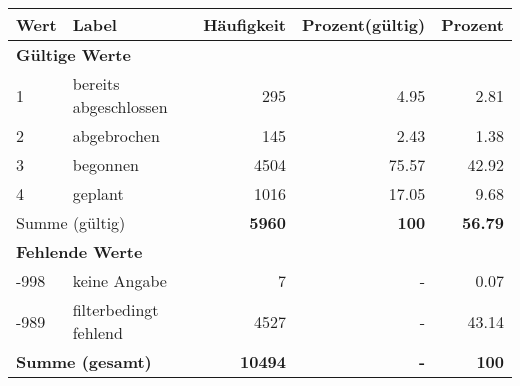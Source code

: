      \begin{longtable}{lXrrr}
     \toprule
     \textbf{Wert} & \textbf{Label} & \textbf{Häufigkeit} & \textbf{Prozent(gültig)} & \textbf{Prozent} \\
     \endhead
     \midrule
     \multicolumn{5}{l}{\textbf{Gültige Werte}}\\

     1 &
     \multicolumn{1}{X}{ bereits abgeschlossen   } &


       \num{295} &
       \num[round-mode=places,round-precision=2]{4.95} &
         \num[round-mode=places,round-precision=2]{2.81} \\

     2 &
     \multicolumn{1}{X}{ abgebrochen   } &


       \num{145} &
       \num[round-mode=places,round-precision=2]{2.43} &
         \num[round-mode=places,round-precision=2]{1.38} \\

     3 &
     \multicolumn{1}{X}{ begonnen   } &


       \num{4504} &
       \num[round-mode=places,round-precision=2]{75.57} &
         \num[round-mode=places,round-precision=2]{42.92} \\

     4 &
     \multicolumn{1}{X}{ geplant   } &


       \num{1016} &
       \num[round-mode=places,round-precision=2]{17.05} &
         \num[round-mode=places,round-precision=2]{9.68} \\
     \midrule
     \multicolumn{2}{l}{Summe (gültig)} &
       \textbf{\num{5960}} &
     \textbf{\num{100}} &
       \textbf{\num[round-mode=places,round-precision=2]{56.79}} \\
     \multicolumn{5}{l}{\textbf{Fehlende Werte}}\\
       -998 &
       keine Angabe &
         \num{7} &
        - &
         \num[round-mode=places,round-precision=2]{0.07} \\
       -989 &
       filterbedingt fehlend &
         \num{4527} &
        - &
         \num[round-mode=places,round-precision=2]{43.14} \\
     \midrule
     \multicolumn{2}{l}{\textbf{Summe (gesamt)}} &
          \textbf{\num{10494}} &
        \textbf{-} &
        \textbf{\num{100}} \\
     \bottomrule
     \end{longtable}
     
